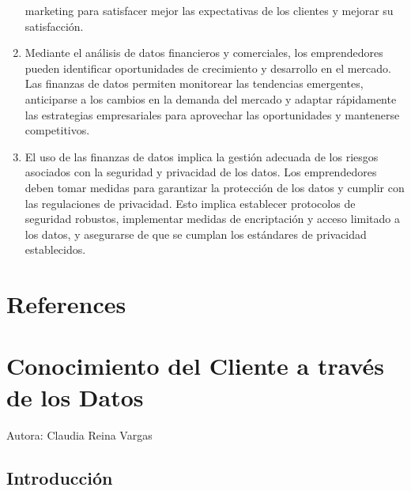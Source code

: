 \documentclass[
  letterpaper,
  DIV=11,
  numbers=noendperiod]{scrreprt}
\begin{document}
\begin{enumerate}
  marketing para satisfacer mejor las expectativas de los clientes y
  mejorar su satisfacción.
\item
  Mediante el análisis de datos financieros y comerciales, los
  emprendedores pueden identificar oportunidades de crecimiento y
  desarrollo en el mercado. Las finanzas de datos permiten monitorear
  las tendencias emergentes, anticiparse a los cambios en la demanda del
  mercado y adaptar rápidamente las estrategias empresariales para
  aprovechar las oportunidades y mantenerse competitivos.
\item
  El uso de las finanzas de datos implica la gestión adecuada de los
  riesgos asociados con la seguridad y privacidad de los datos. Los
  emprendedores deben tomar medidas para garantizar la protección de los
  datos y cumplir con las regulaciones de privacidad. Esto implica
  establecer protocolos de seguridad robustos, implementar medidas de
  encriptación y acceso limitado a los datos, y asegurarse de que se
  cumplan los estándares de privacidad establecidos.
\end{enumerate}


\hypertarget{references}{%
\chapter{References}\label{references}}


\hypertarget{conocimiento-del-cliente-a-travuxe9s-de-los-datos}{%
\chapter{Conocimiento del Cliente a través de los
Datos}\label{conocimiento-del-cliente-a-travuxe9s-de-los-datos}}

Autora: Claudia Reina Vargas

\hypertarget{introducciuxf3n-2}{%
\section{Introducción}\label{introducciuxf3n-2}}
\end{document}
